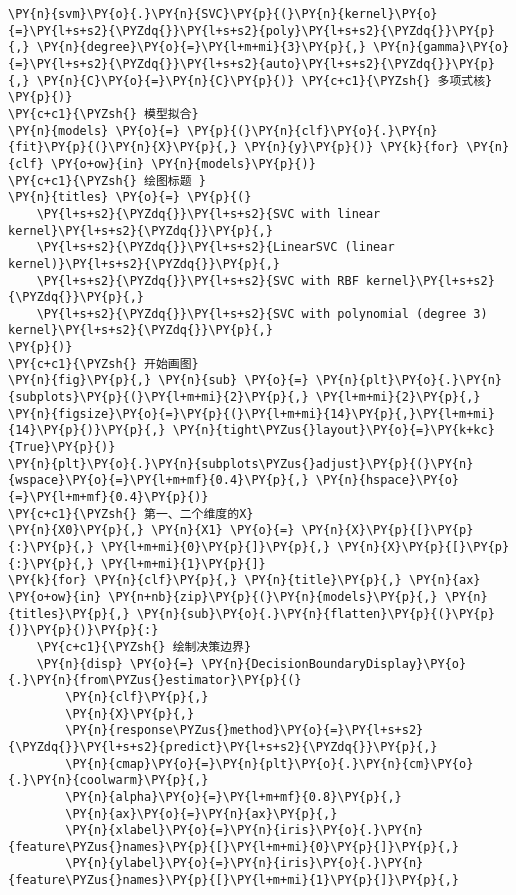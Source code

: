 \begin{Verbatim}[commandchars=\\\{\}]
    \PY{n}{svm}\PY{o}{.}\PY{n}{SVC}\PY{p}{(}\PY{n}{kernel}\PY{o}{=}\PY{l+s+s2}{\PYZdq{}}\PY{l+s+s2}{poly}\PY{l+s+s2}{\PYZdq{}}\PY{p}{,} \PY{n}{degree}\PY{o}{=}\PY{l+m+mi}{3}\PY{p}{,} \PY{n}{gamma}\PY{o}{=}\PY{l+s+s2}{\PYZdq{}}\PY{l+s+s2}{auto}\PY{l+s+s2}{\PYZdq{}}\PY{p}{,} \PY{n}{C}\PY{o}{=}\PY{n}{C}\PY{p}{)} \PY{c+c1}{\PYZsh{} 多项式核}
\PY{p}{)}
\PY{c+c1}{\PYZsh{} 模型拟合}
\PY{n}{models} \PY{o}{=} \PY{p}{(}\PY{n}{clf}\PY{o}{.}\PY{n}{fit}\PY{p}{(}\PY{n}{X}\PY{p}{,} \PY{n}{y}\PY{p}{)} \PY{k}{for} \PY{n}{clf} \PY{o+ow}{in} \PY{n}{models}\PY{p}{)}
\PY{c+c1}{\PYZsh{} 绘图标题 }
\PY{n}{titles} \PY{o}{=} \PY{p}{(}
    \PY{l+s+s2}{\PYZdq{}}\PY{l+s+s2}{SVC with linear kernel}\PY{l+s+s2}{\PYZdq{}}\PY{p}{,}
    \PY{l+s+s2}{\PYZdq{}}\PY{l+s+s2}{LinearSVC (linear kernel)}\PY{l+s+s2}{\PYZdq{}}\PY{p}{,}
    \PY{l+s+s2}{\PYZdq{}}\PY{l+s+s2}{SVC with RBF kernel}\PY{l+s+s2}{\PYZdq{}}\PY{p}{,}
    \PY{l+s+s2}{\PYZdq{}}\PY{l+s+s2}{SVC with polynomial (degree 3) kernel}\PY{l+s+s2}{\PYZdq{}}\PY{p}{,}
\PY{p}{)}
\PY{c+c1}{\PYZsh{} 开始画图}
\PY{n}{fig}\PY{p}{,} \PY{n}{sub} \PY{o}{=} \PY{n}{plt}\PY{o}{.}\PY{n}{subplots}\PY{p}{(}\PY{l+m+mi}{2}\PY{p}{,} \PY{l+m+mi}{2}\PY{p}{,} \PY{n}{figsize}\PY{o}{=}\PY{p}{(}\PY{l+m+mi}{14}\PY{p}{,}\PY{l+m+mi}{14}\PY{p}{)}\PY{p}{,} \PY{n}{tight\PYZus{}layout}\PY{o}{=}\PY{k+kc}{True}\PY{p}{)}
\PY{n}{plt}\PY{o}{.}\PY{n}{subplots\PYZus{}adjust}\PY{p}{(}\PY{n}{wspace}\PY{o}{=}\PY{l+m+mf}{0.4}\PY{p}{,} \PY{n}{hspace}\PY{o}{=}\PY{l+m+mf}{0.4}\PY{p}{)}
\PY{c+c1}{\PYZsh{} 第一、二个维度的X}
\PY{n}{X0}\PY{p}{,} \PY{n}{X1} \PY{o}{=} \PY{n}{X}\PY{p}{[}\PY{p}{:}\PY{p}{,} \PY{l+m+mi}{0}\PY{p}{]}\PY{p}{,} \PY{n}{X}\PY{p}{[}\PY{p}{:}\PY{p}{,} \PY{l+m+mi}{1}\PY{p}{]}
\PY{k}{for} \PY{n}{clf}\PY{p}{,} \PY{n}{title}\PY{p}{,} \PY{n}{ax} \PY{o+ow}{in} \PY{n+nb}{zip}\PY{p}{(}\PY{n}{models}\PY{p}{,} \PY{n}{titles}\PY{p}{,} \PY{n}{sub}\PY{o}{.}\PY{n}{flatten}\PY{p}{(}\PY{p}{)}\PY{p}{)}\PY{p}{:}
    \PY{c+c1}{\PYZsh{} 绘制决策边界}
    \PY{n}{disp} \PY{o}{=} \PY{n}{DecisionBoundaryDisplay}\PY{o}{.}\PY{n}{from\PYZus{}estimator}\PY{p}{(}
        \PY{n}{clf}\PY{p}{,}
        \PY{n}{X}\PY{p}{,}
        \PY{n}{response\PYZus{}method}\PY{o}{=}\PY{l+s+s2}{\PYZdq{}}\PY{l+s+s2}{predict}\PY{l+s+s2}{\PYZdq{}}\PY{p}{,}
        \PY{n}{cmap}\PY{o}{=}\PY{n}{plt}\PY{o}{.}\PY{n}{cm}\PY{o}{.}\PY{n}{coolwarm}\PY{p}{,}
        \PY{n}{alpha}\PY{o}{=}\PY{l+m+mf}{0.8}\PY{p}{,}
        \PY{n}{ax}\PY{o}{=}\PY{n}{ax}\PY{p}{,}
        \PY{n}{xlabel}\PY{o}{=}\PY{n}{iris}\PY{o}{.}\PY{n}{feature\PYZus{}names}\PY{p}{[}\PY{l+m+mi}{0}\PY{p}{]}\PY{p}{,}
        \PY{n}{ylabel}\PY{o}{=}\PY{n}{iris}\PY{o}{.}\PY{n}{feature\PYZus{}names}\PY{p}{[}\PY{l+m+mi}{1}\PY{p}{]}\PY{p}{,}

\end{Verbatim}
